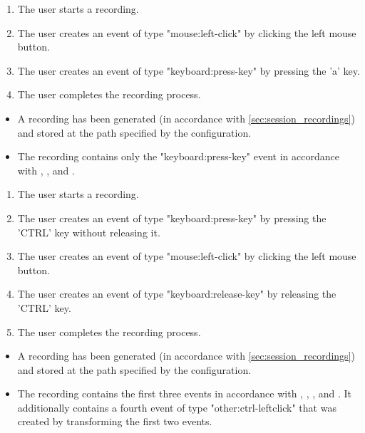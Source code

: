 \begin{tests}
    {\begin{enumerate}
        \item The \gls{user} starts a recording.
        \item The \gls{user} creates an \gls{event} of type "mouse:left-click" by clicking the left mouse button.
        \item The \gls{user} creates an \gls{event} of type "keyboard:press-key" by pressing the 'a' key.
        \item The \gls{user} completes the recording process.
    \end{enumerate}}
    {\begin{itemize}
        \item A recording has been generated (in accordance with \ref{sec:session_recordings}) and stored at the path specified by the configuration.
        \item The recording contains only the "keyboard:press-key" \gls{event} in accordance with , ,  and .
    \end{itemize}}
\newpage
    {\begin{enumerate}
        \item The \gls{user} starts a recording.
        \item The \gls{user} creates an \gls{event} of type "keyboard:press-key" by pressing the 'CTRL' key without releasing it.
        \item The \gls{user} creates an \gls{event} of type "mouse:left-click" by clicking the left mouse button.
        \item The \gls{user} creates an \gls{event} of type "keyboard:release-key" by releasing the 'CTRL' key.
        \item The \gls{user} completes the recording process.
    \end{enumerate}}
    {\begin{itemize}
        \item A recording has been generated (in accordance with \ref{sec:session_recordings}) and stored at the path specified by the configuration.
        \item The recording contains the first three events in accordance with , , ,  and . It additionally contains a fourth \gls{event} of type "other:ctrl-leftclick" that was created by transforming the first two \glspl{event}.
    \end{itemize}}


\end{tests}
